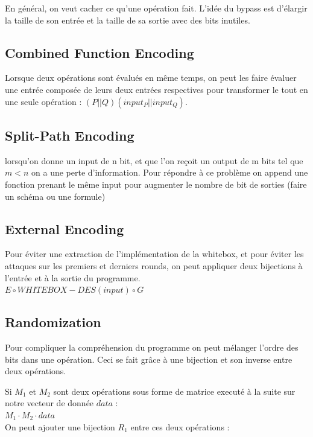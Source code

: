 \documentclass[a4paper,12pt]{article}
\begin{document}
En général, on veut cacher ce qu'une opération fait. L'idée du bypass est d'élargir la taille de son entrée et la taille de sa sortie avec des bits inutiles.


\subsection{Combined Function Encoding}

Lorsque deux opérations sont évalués en même temps, on peut les faire évaluer une entrée composée de leurs deux entrées respectives pour transformer le tout en une seule opération : $(P||Q)(input_P||input_Q)$.

\subsection{Split-Path Encoding}

lorsqu'on donne un input de n bit, et que l'on reçoit un output de m bits tel que $m < n$ on a une perte d'information. Pour répondre à ce problème on append une fonction prenant le même input pour augmenter le nombre de bit de sorties (faire un schéma ou une formule)


\subsection{External Encoding}

Pour éviter une extraction de l'implémentation de la whitebox, et pour éviter les attaques sur les premiers et derniers rounds, on peut appliquer deux bijections à l'entrée et à la sortie du programme.\\

$E \circ WHITEBOX-DES(input) \circ G$


\subsection{Randomization}

Pour compliquer la compréhension du programme on peut mélanger l'ordre des bits dans une opération. Ceci se fait grâce à une bijection et son inverse entre deux opérations.

Si $M_1$ et $M_2$ sont deux opérations sous forme de matrice executé à la suite sur notre vecteur de donnée $data$ :\\

$M_1 \cdot M_2 \cdot data$\\

On peut ajouter une bijection $R_1$ entre ces deux opérations :\\
\end{document}
